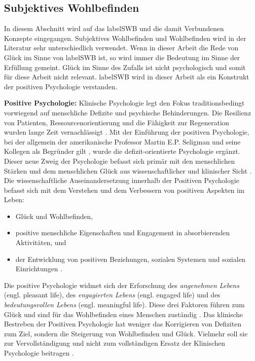\subsection{Subjektives Wohlbefinden}\label{subsection.subjektivesWohlbefinden}
In diesem Abschnitt wird auf das \gls{labelSWB} und die damit Verbundenen Konzepte eingegangen. Subjektives Wohlbefinden und Wohlbefinden wird in der Literatur sehr unterschiedlich verwendet. Wenn in dieser Arbeit die Rede von Glück im Sinne von \gls{labelSWB} ist, so wird immer die Bedeutung im Sinne der Erfüllung gemeint. Glück im Sinne des Zufalls ist nicht psychologisch und somit für diese Arbeit nicht relevant. \Gls{labelSWB} wird in dieser Arbeit als ein Konstrukt der positiven Psychologie verstanden. 
\par
\textbf{Positive Psychologie:} 
Klinische Psychologie legt den Fokus traditionsbedingt vorwiegend auf menschliche Defizite und psychische Behinderungen. Die Resilienz von Patienten, Ressourcenorientierung und die Fähigkeit zur Regeneration wurden lange Zeit vernachlässigt \cite{Carr2011}. Mit der Einführung der positiven Psychologie, bei der allgemein der amerikanische Professor Martin E.P. Seligman und seine Kollegen als Begründer gilt \cite{Seligman2003}, wurde die defizit-orientierte Psychologie ergänzt. Dieser neue Zweig der Psychologie befasst sich primär mit den menschlichen Stärken und dem menschlichen Glück aus wissenschaftlicher und klinischer Sicht \cite{Carr2011}. Die wissenschaftliche Auseinandersetzung innerhalb der Positiven Psychologie befasst sich mit dem Verstehen und dem Verbessern von positiven Aspekten im Leben:
\begin{itemize}
    \item Glück und Wohlbefinden,
    \item positive menschliche Eigenschaften und Engagement in absorbierenden Aktivitäten, und
    \item der Entwicklung von positiven Beziehungen, sozialen Systemen und sozialen Einrichtungen \cite{Lopez2009, Seligman2003}.
\end{itemize}
Die positive Psychologie widmet sich der Erforschung des \textit{angenehmen Lebens} (engl. pleasant life), des \textit{engagierten Lebens} (engl. engaged life) und des \textit{bedeutungsvollen Lebens} (engl. meaningful life). Diese drei Faktoren führen zum Glück und sind für das Wohlbefinden eines Menschen zuständig \cite{Peterson2005}. Das klinische Bestreben der Positiven Psychologie hat weniger das Korrigieren von Defiziten zum Ziel, sondern die Steigerung von Wohlbefinden und Glück. Vielmehr soll sie zur Vervollständigung und nicht zum vollständigen Ersatz der Klinischen Psychologie beitragen \cite{Carr2011}.
